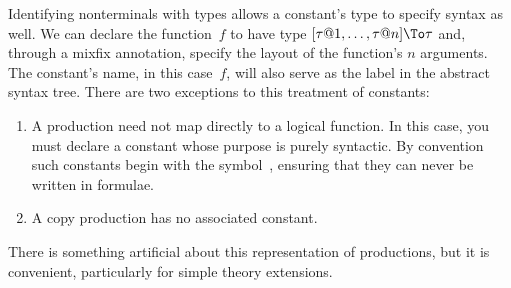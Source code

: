 Identifying nonterminals with types allows a constant's type to specify
syntax as well.  We can declare the function~$f$ to have type $[\tau@1,
\ldots, \tau@n]\To \tau$ and, through a mixfix annotation, specify the
layout of the function's $n$ arguments.  The constant's name, in this
case~$f$, will also serve as the label in the abstract syntax tree.  There
are two exceptions to this treatment of constants:
\begin{enumerate}
  \item A production need not map directly to a logical function.  In this
    case, you must declare a constant whose purpose is purely syntactic.
    By convention such constants begin with the symbol~{\tt\at}, 
    ensuring that they can never be written in formulae.

  \item A copy production has no associated constant.
\end{enumerate}
There is something artificial about this representation of productions,
but it is convenient, particularly for simple theory extensions.


